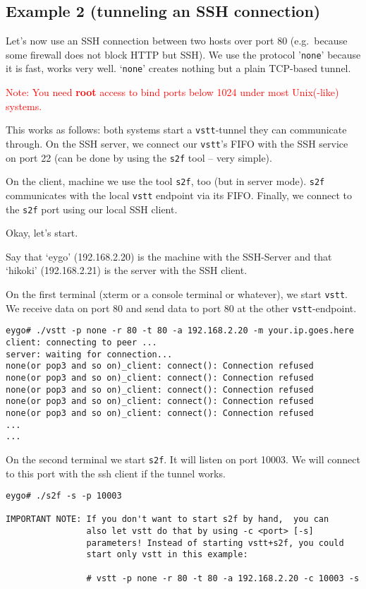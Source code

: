 \documentclass[10pt,a4paper]{article}
\begin{document}
\subsection{Example 2 (tunneling an SSH connection)}

Let's now use an SSH connection between two hosts over
port 80 (e.g.\ because some firewall does not block HTTP but SSH).
We use the protocol '\texttt{none}' because it is fast, works very well. `\texttt{none}'
creates nothing but a plain TCP-based tunnel.

\textcolor{red}{Note: You need \textbf{root} access to bind ports below
1024 under most Unix(-like) systems.}

This works as follows: both systems start a \texttt{vstt}-tunnel they
can communicate through. On the SSH server, we connect our \texttt{vstt}'s FIFO
with the SSH service on port 22 (can be done by using the
\texttt{s2f} tool -- very simple).

On the client, machine we use the tool \texttt{s2f}, too (but in server
mode). \texttt{s2f} communicates with the local \texttt{vstt} endpoint via its FIFO.
Finally, we connect to the \texttt{s2f} port using our local SSH client.

Okay, let's start.

Say that `eygo' (192.168.2.20) is the machine with the SSH-Server and that
`hikoki' (192.168.2.21) is the server with the SSH client.

On the first terminal (xterm or a console terminal or whatever), we
start \texttt{vstt}. We receive data on port 80 and send data to port 80 at
the other \texttt{vstt}-endpoint.

\begin{verbatim}
eygo# ./vstt -p none -r 80 -t 80 -a 192.168.2.20 -m your.ip.goes.here
client: connecting to peer ...
server: waiting for connection...
none(or pop3 and so on)_client: connect(): Connection refused
none(or pop3 and so on)_client: connect(): Connection refused
none(or pop3 and so on)_client: connect(): Connection refused
none(or pop3 and so on)_client: connect(): Connection refused
none(or pop3 and so on)_client: connect(): Connection refused
...
...
\end{verbatim}

On the second terminal we start \texttt{s2f}. It will listen on port 10003. We will
connect to this port with the ssh client if the tunnel works.

\begin{verbatim}
eygo# ./s2f -s -p 10003

IMPORTANT NOTE: If you don't want to start s2f by hand,  you can
                also let vstt do that by using -c <port> [-s]
                parameters! Instead of starting vstt+s2f, you could
                start only vstt in this example:
                
                # vstt -p none -r 80 -t 80 -a 192.168.2.20 -c 10003 -s
\end{verbatim}
\end{document}
